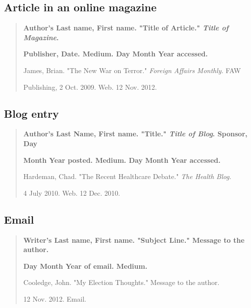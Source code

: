 \subsection{Article in an online magazine}

\begin{quote}
\textbf{Author's Last name, First name. "Title of Article." \emph{Title of Magazine}. }

\hspace{.4in}\textbf{Publisher, Date. Medium. Day Month Year accessed.}

\medskip

James, Brian. "The New War on Terror." \emph{Foreign Affairs Monthly}. FAW 

\hspace{.4in}Publishing, 2 Oct. 2009. Web. 12 Nov. 2012.

\end{quote}


\subsection{Blog entry}
\begin{quote}
\textbf{Author's Last Name, First name. "Title." \emph{Title of Blog}. Sponsor, Day}

\hspace{.4in}\textbf{Month Year posted. Medium. Day Month Year accessed.}

\medskip

Hardeman, Chad. "The Recent Healthcare Debate." \emph{The Health Blog}. 

\hspace{.4in}4 July 2010. Web. 12 Dec. 2010.

\end{quote}


\subsection{Email}
\begin{quote}
\textbf{Writer's Last name, First name. "Subject Line." Message to the author.} 

\hspace{.4in}\textbf{Day Month Year of email. Medium.}

\medskip
Cooledge, John. "My Election Thoughts." Message to the author. 

\hspace{.4in}12 Nov. 2012. Email.
\end{quote}

